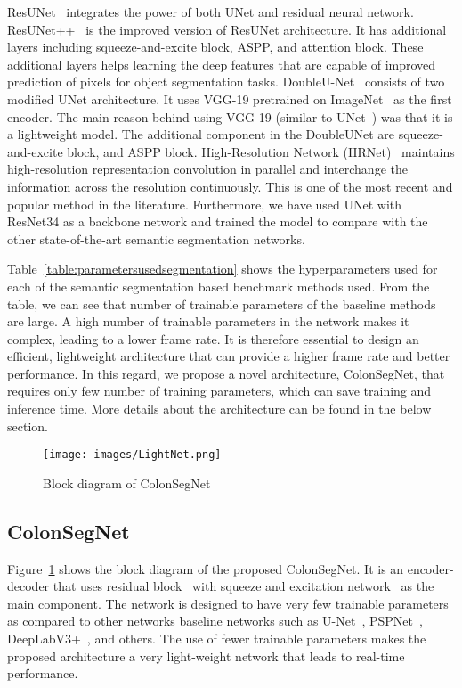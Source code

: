 \documentclass[journal]{IEEEtran}
\begin{document}
ResUNet~\cite{zhang2018road} integrates the power of both UNet and residual neural network. ResUNet++~\cite{jha2019resunet++} is the improved version of ResUNet architecture. It has additional layers including squeeze-and-excite block, \ac{ASPP}, and attention block. These additional layers helps learning the deep features that are capable of improved prediction of pixels for object segmentation tasks. DoubleU-Net~\cite{jha2020doubleu} consists of two modified UNet architecture. It uses VGG-19 pretrained on ImageNet~\cite{deng2009imagenet} as the first encoder. The main reason behind using VGG-19 (similar to UNet~\cite{simonyan2014very}) was that it is a lightweight model. The additional component in the DoubleUNet are squeeze-and-excite block, and \ac{ASPP} block. High-Resolution Network (HRNet)~\cite{wang2020deep} maintains high-resolution representation convolution in parallel and interchange the information across the resolution continuously. This is one of the most recent and popular method in the literature. Furthermore, we have used UNet with ResNet34 as a backbone network and trained the model to compare with the other state-of-the-art semantic segmentation networks. 


Table~\ref{table:parametersusedsegmentation} shows the hyperparameters used for each of the semantic segmentation based benchmark methods used. From the table, we can see that number of trainable parameters of the baseline methods are large. A high number of trainable parameters in the network makes it complex, leading to a lower frame rate. It is therefore essential to design an efficient, lightweight architecture that can provide a higher frame rate and better performance. In this regard, we propose a novel architecture, ColonSegNet, that requires only few number of training parameters, which can save training and inference time. More details about the architecture can be found in the below section. 

\begin{figure}[t!]
    \centering
    \texttt{[image: images/LightNet.png]}
    \caption{Block diagram of ColonSegNet}
    \label{fig:colonsegnet_diagram}
\end{figure}


\subsection{ColonSegNet}
Figure~\ref{fig:colonsegnet_diagram} shows the block diagram of the proposed ColonSegNet. It is an encoder-decoder that uses residual block~\cite{he2016deep} with squeeze and excitation network~\cite{hu2018squeeze} as the main component. The network is designed to have very few trainable parameters as compared to other networks baseline networks such as U-Net~\cite{ronneberger2015u}, PSPNet~\cite{zhao2017pyramid}, DeepLabV3+~\cite{chen2018encoder}, and others.  The use of fewer trainable parameters makes the proposed architecture a very light-weight network that leads to real-time performance.
\end{document}
